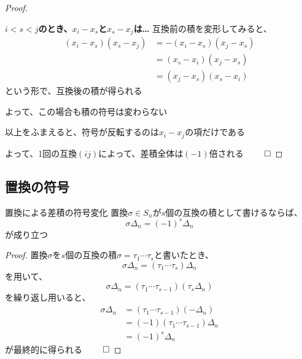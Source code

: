\documentclass[../../../topic_linear-algebra]{subfiles}
\begin{document}
\begin{proof}
\begin{subpattern}{\bfseries $i < s < j$のとき、$x_i - x_s$と$x_s - x_j$は…}
    互換前の積を変形してみると、
    \begin{align*}
      (x_i - x_s)(x_s - x_j) & = -(x_i - x_s)(x_j - x_s) \\
                             & = (x_s - x_i)(x_j - x_s)  \\
                             & = (x_j - x_s)(x_s - x_i)
    \end{align*}
    という形で、互換後の積が得られる

    よって、この場合も積の符号は変わらない
  \end{subpattern}

  以上をふまえると、符号が反転するのは$x_i - x_j$の項だけである

  よって、1回の互換$(ij)$によって、差積全体は$(-1)$倍される $\qed$
\end{proof}

\subsection{置換の符号}

\begin{theorem*}{置換による差積の符号変化}
  置換$\sigma \in S_n$が$s$個の互換の積として書けるならば、
  \begin{equation*}
    \sigma \Delta_n = (-1)^s \Delta_n
  \end{equation*}
  が成り立つ
\end{theorem*}

\begin{proof}
  置換$\sigma$を$s$個の互換の積$\sigma = \tau_1 \cdots \tau_s$と書いたとき、
  \begin{equation*}
    \sigma \Delta_n = (\tau_1 \cdots \tau_s) \Delta_n
  \end{equation*}
  を用いて、
  \begin{equation*}
    \sigma \Delta_n = (\tau_1 \cdots \tau_{s-1}) (\tau_s \Delta_n)
  \end{equation*}
  を繰り返し用いると、
  \begin{align*}
    \sigma \Delta_n & = (\tau_1 \cdots \tau_{s-1}) (-\Delta_n)  \\
                    & = (-1)(\tau_1 \cdots \tau_{s-1}) \Delta_n \\
                    & = (-1)^s \Delta_n
  \end{align*}
  が最終的に得られる $\qed$
\end{proof}
\end{document}
